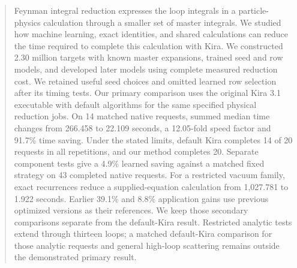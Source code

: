 \begin{abstract}
Feynman integral reduction expresses the loop integrals in a particle-physics calculation through a smaller set of master integrals. We studied how machine learning, exact identities, and shared calculations can reduce the time required to complete this calculation with Kira. We constructed 2.30 million targets with known master expansions, trained seed and row models, and developed later models using complete measured reduction cost. We retained useful seed choices and omitted learned row selection after its timing tests. Our primary comparison uses the original Kira 3.1 executable with default algorithms for the same specified physical reduction jobs.
On 14 matched native requests, summed median time changes from 266.458 to 22.109 seconds, a 12.05-fold speed factor and 91.7\% time saving. Under the stated limits, default Kira completes 14 of 20 requests in all repetitions, and our method completes 20.
Separate component tests give a 4.9\% learned saving against a matched fixed strategy on 43 completed native requests. For a restricted vacuum family, exact recurrences reduce a supplied-equation calculation from 1,027.781 to 1.922 seconds. Earlier 39.1\% and 8.8\% application gains use previous optimized versions as their references. We keep those secondary comparisons separate from the default-Kira result. Restricted analytic tests extend through thirteen loops; a matched default-Kira comparison for those analytic requests and general high-loop scattering remains outside the demonstrated primary result.
\end{abstract}
